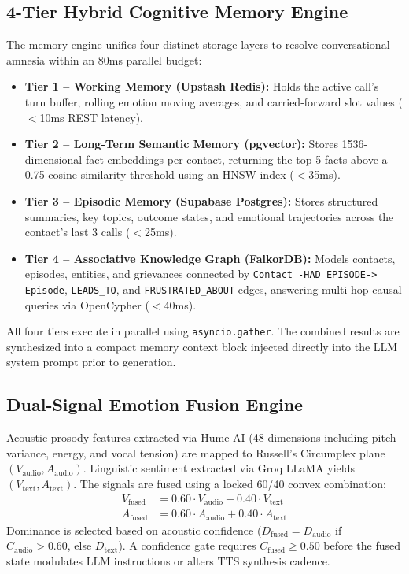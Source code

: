 \documentclass[12pt,a4paper]{article}
\begin{document}
\subsection{4-Tier Hybrid Cognitive Memory Engine}
The memory engine unifies four distinct storage layers to resolve conversational amnesia within an 80ms parallel budget:
\begin{itemize}
    \item \textbf{Tier 1 -- Working Memory (Upstash Redis):} Holds the active call's turn buffer, rolling emotion moving averages, and carried-forward slot values ($<$10ms REST latency).
    \item \textbf{Tier 2 -- Long-Term Semantic Memory (pgvector):} Stores 1536-dimensional fact embeddings per contact, returning the top-5 facts above a 0.75 cosine similarity threshold using an HNSW index ($<$35ms).
    \item \textbf{Tier 3 -- Episodic Memory (Supabase Postgres):} Stores structured summaries, key topics, outcome states, and emotional trajectories across the contact's last 3 calls ($<$25ms).
    \item \textbf{Tier 4 -- Associative Knowledge Graph (FalkorDB):} Models contacts, episodes, entities, and grievances connected by \texttt{Contact -HAD\_EPISODE-> Episode}, \texttt{LEADS\_TO}, and \texttt{FRUSTRATED\_ABOUT} edges, answering multi-hop causal queries via OpenCypher ($<$40ms).
\end{itemize}
All four tiers execute in parallel using \texttt{asyncio.gather}. The combined results are synthesized into a compact memory context block injected directly into the LLM system prompt prior to generation.

\subsection{Dual-Signal Emotion Fusion Engine}
Acoustic prosody features extracted via Hume AI (48 dimensions including pitch variance, energy, and vocal tension) are mapped to Russell's Circumplex plane $(V_{\text{audio}}, A_{\text{audio}})$. Linguistic sentiment extracted via Groq LLaMA yields $(V_{\text{text}}, A_{\text{text}})$. The signals are fused using a locked 60/40 convex combination:
\begin{align}
    V_{\text{fused}} &= 0.60 \cdot V_{\text{audio}} + 0.40 \cdot V_{\text{text}} \\
    A_{\text{fused}} &= 0.60 \cdot A_{\text{audio}} + 0.40 \cdot A_{\text{text}}
\end{align}
Dominance is selected based on acoustic confidence ($D_{\text{fused}} = D_{\text{audio}}$ if $C_{\text{audio}} > 0.60$, else $D_{\text{text}}$). A confidence gate requires $C_{\text{fused}} \ge 0.50$ before the fused state modulates LLM instructions or alters TTS synthesis cadence.
\end{document}
